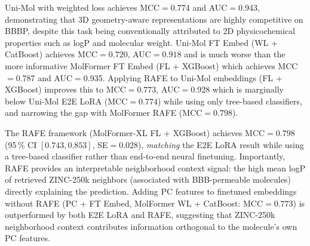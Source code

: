 \documentclass[pdflatex,sn-mathphys-num]{sn-jnl}%
\theoremstyle{thmstyleone}%
\theoremstyle{thmstyletwo}%
\theoremstyle{thmstylethree}%
\begin{document}
Uni-Mol with weighted loss achieves MCC$=$0.774 and AUC$=$0.943, demonstrating that 3D geometry-aware representations are highly competitive on BBBP, despite this task being conventionally attributed to 2D physicochemical properties such as logP and molecular weight. Uni-Mol FT Embed (WL + CatBoost) achieves MCC$=0.720$, AUC$=0.918$ and is much worse than the more informative MolFormer FT Embed (FL + XGBoost) which achieves MCC$=$0.787 and AUC$=$0.935. Applying RAFE to Uni-Mol embeddings (FL + XGBoost) improves this to MCC$=0.773$, AUC$=$0.928 which is marginally below Uni-Mol E2E LoRA (MCC$=0.774$) while using only tree-based classifiers, and narrowing the gap with MolFormer RAFE (MCC$=0.798$).

The RAFE framework (MolFormer-XL FL + XGBoost) achieves MCC$= 0.798$ (95\,\% CI $[0.743, 0.853]$, SE$= $0.028), \emph{matching} the E2E LoRA result while using a tree-based classifier rather than end-to-end neural finetuning. Importantly, RAFE provides an interpretable neighborhood context signal: the high mean logP of retrieved ZINC-250k neighbors (associated with BBB-permeable molecules) directly explaining the prediction. Adding PC features to finetuned embeddings without RAFE (PC + FT Embed, MolFormer WL + CatBoost: MCC$= 0.773$) is outperformed by both E2E LoRA and RAFE, suggesting that ZINC-250k neighborhood context contributes information orthogonal to the molecule's own PC features.
\end{document}

